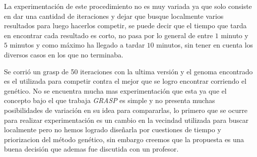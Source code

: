 La experimentación de este procedimiento no es muy variada ya que solo consiste en dar una cantidad de iteraciones y dejar que
busque localmente varios resultados para luego hacerlos competir, se puede decir que el tiempo que tarda en encontrar
cada resultado es corto, no pasa por lo general de entre $1$ minuto y $5$ minutos y como máximo ha llegado a tardar $10$ minutos, sin tener en cuenta
los diversos casos en los que no terminaba.


Se corrió un grasp de 50 iteraciones con la ultima versión y el genoma encontrado es el utilizada para competir contra el mejor que se logro encontrar
corriendo el genético. No se encuentra mucha mas experimentación que esta ya que el concepto bajo el que trabaja \emph{GRASP}
es simple y no presenta muchas posibilidades de variación en su idea para compararlas, lo primero que se ocurre para realizar
experimentación es un cambio en la vecindad utilizada para buscar localmente pero no hemos logrado diseñarla por cuestiones
de tiempo y priorizacion del método genético, sin embargo
creemos que la propuesta es una buena decisión que ademas fue discutida con un profesor.
